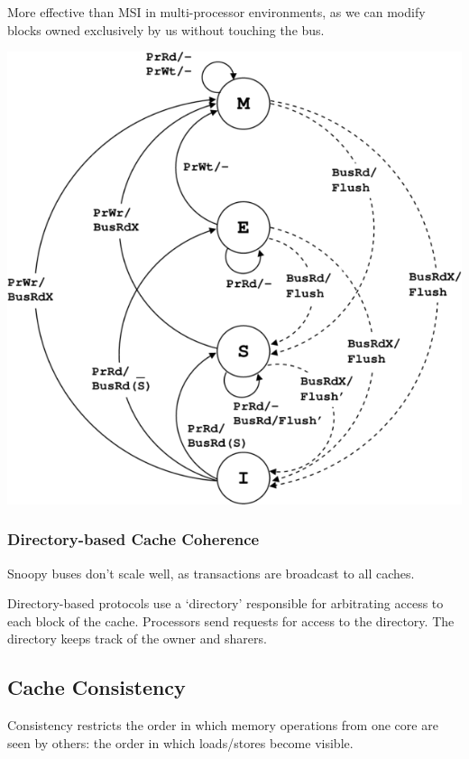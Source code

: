 \documentclass[11pt]{article}
\begin{document}
{{{\begin{minipage}[t]{0.35\textwidth}
            More effective than MSI in multi-processor environments, as we can modify blocks owned exclusively by us without touching the bus.
            \end{minipage}
            \begin{minipage}[t]{0.55\textwidth}
            \vspace{0pt}
            \centering
            \includegraphics[width=\textwidth]{mesi.png}
            \end{minipage}
        }
        \subsubsection*{Directory-based Cache Coherence}
        {
            Snoopy buses don't scale well, as transactions are broadcast to all caches.

            Directory-based protocols use a `directory' responsible for arbitrating access to each block of the cache. Processors send requests for access to the directory. The directory keeps track of the owner and sharers.
        }
    }
    \subsection*{Cache Consistency}
    {
        Consistency restricts the order in which memory operations from one core are seen by others: the order in which loads/stores become visible.

}}
\end{document}
